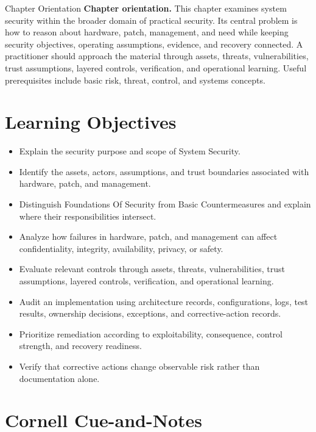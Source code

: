 \documentclass[11pt,letterpaper]{article}
\title{\CornellDocumentTitle}
\author{}
\date{}
\begin{document}
\maketitle
\begin{CornellOverviewBox}{Chapter Orientation}
\textbf{Chapter orientation.} This chapter examines system security within the broader domain of practical security. Its central problem is how to reason about hardware, patch, management, and need while keeping security objectives, operating assumptions, evidence, and recovery connected. A practitioner should approach the material through assets, threats, vulnerabilities, trust assumptions, layered controls, verification, and operational learning. Useful prerequisites include basic risk, threat, control, and systems concepts.
\end{CornellOverviewBox}
\section*{Learning Objectives}
\begin{itemize}
\item Explain the security purpose and scope of System Security.
\item Identify the assets, actors, assumptions, and trust boundaries associated with hardware, patch, and management.
\item Distinguish Foundations Of Security from Basic Countermeasures and explain where their responsibilities intersect.
\item Analyze how failures in hardware, patch, and management can affect confidentiality, integrity, availability, privacy, or safety.
\item Evaluate relevant controls through assets, threats, vulnerabilities, trust assumptions, layered controls, verification, and operational learning.
\item Audit an implementation using architecture records, configurations, logs, test results, ownership decisions, exceptions, and corrective-action records.
\item Prioritize remediation according to exploitability, consequence, control strength, and recovery readiness.
\item Verify that corrective actions change observable risk rather than documentation alone.
\end{itemize}
\section*{Cornell Cue-and-Notes}
\end{document}
